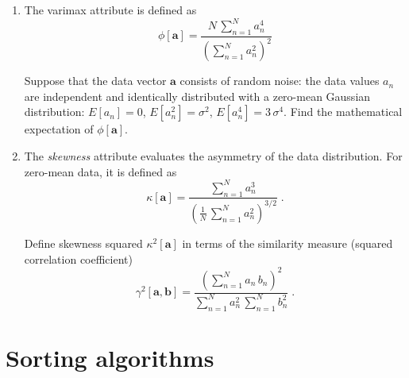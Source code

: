 \begin{enumerate}

\item The varimax attribute is defined as
\begin{equation}
  \label{eq:varimax}
\phi[\mathbf{a}] = \frac{\displaystyle N\,\sum\limits_{n=1}^N
  a_n^4}{\displaystyle \left(\sum\limits_{n=1}^{N} a_n^2\right)^2}
\end{equation}

Suppose that the data vector $\mathbf{a}$ consists of random noise:
the data values $a_n$ are independent and identically distributed with
a zero-mean Gaussian distribution: $E[a_n]=0$, $E[a_n^2]=\sigma^2$,
$E[a_n^4]=3\,\sigma^4$. Find the mathematical expectation of
$\phi[\mathbf{a}]$.

\item The \emph{skewness} attribute evaluates the asymmetry of the data
  distribution. For zero-mean data, it is defined as
\begin{equation}
  \label{eq:skewness}
\kappa[\mathbf{a}] = \frac{\displaystyle \sum\limits_{n=1}^N
  a_n^3}{\displaystyle \left(\frac{1}{N}\,\sum\limits_{n=1}^{N} a_n^2\right)^{3/2}}\;.
\end{equation}

Define skewness squared $\kappa^2[\mathbf{a}]$ in terms of the similarity
measure (squared correlation coefficient) 
\begin{equation}
\label{eq:gamma}
\gamma^2[\mathbf{a},\mathbf{b}] = 
\frac{\displaystyle \left(\sum\limits_{n=1}^N a_n\,b_n\right)^2}{\displaystyle \sum\limits_{n=1}^N a_n^2\,\sum\limits_{n=1}^N b_n^2}\;.
\end{equation}

\end{enumerate}

\section{Sorting algorithms}

